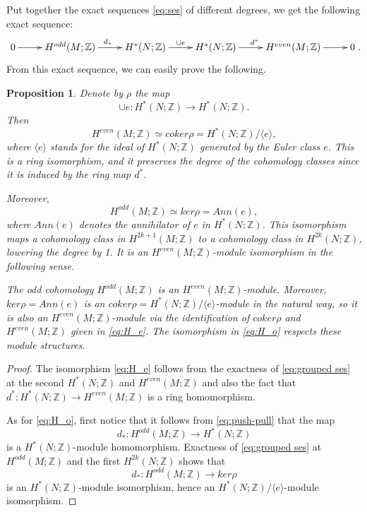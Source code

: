 \documentclass[12pt]{amsart}
\def\Z {{\mathbb{Z}}}
\newtheorem{proposition}[theorem]{Proposition}
\theoremstyle{definition}
\numberwithin{equation}{section}
\begin{document}
Put together the exact sequences \eqref{eq:ses} of different
degrees, we get the following exact sequence:
\begin{equation}\label{eq:grouped ses}
\xymatrix{
  0 \ar[r]^{} & H^{odd}(M;\Z) \ar[r]^{d_{*}} & H^{*}(N;\Z) \ar[r]^{\cup e} & H^{*}(N;\Z)
\ar[r]^{d^{*}} & H^{even}(M;\Z) \ar[r]^{} & 0
  }.
\end{equation}
From this exact sequence, we can easily prove the following.

\begin{proposition}\label{prop:(co)ker rho}
Denote by $\rho$ the map
\[\cup e: H^{*}(N;\Z)\rightarrow H^{*}(N;\Z).\]
Then
\begin{equation}\label{eq:H_e}
H^{even}(M;\Z)\simeq coker\rho = H^{*}(N;\Z)/\langle e\rangle,
\end{equation}
where $\langle e\rangle$ stands for the ideal of $H^{*}(N;\Z)$
generated by the Euler class $e$. This is a ring isomorphism, and it
preserves the degree of the cohomology classes since it is induced
by the ring map $d^{*}$.

 Moreover,
\begin{equation}\label{eq:H_o}
H^{odd}(M;\Z)\simeq  ker\rho = Ann(e),
\end{equation}
where $Ann(e)$ denotes the annihilator of $e$ in $H^{*}(N;\Z)$. This
isomorphism maps a cohomology class in $H^{2k+1}(M;\Z)$ to a
cohomology class in $H^{2k}(N;\Z)$, lowering the degree by 1. It is
an $H^{even}(M;\Z)$-module isomorphism in the following sense.

The odd cohomology $H^{odd}(M;\Z)$ is an $H^{even}(M;\Z)$-module.
Moreover, $ker\rho = Ann(e)$ is an $coker\rho = H^{*}(N;\Z)/\langle
e\rangle$-module in the natural way, so it is also an
$H^{even}(M;\Z)$-module via the identification of $coker\rho$ and
$H^{even}(M;\Z)$ given in \eqref{eq:H_e}. The isomorphism in
\eqref{eq:H_o} respects these module structures.
\end{proposition}
\begin{proof}
The isomorphism \eqref{eq:H_e} follows from the exactness of
\eqref{eq:grouped ses} at the second $H^{*}(N;\Z)$ and
$H^{even}(M;\Z)$ and also the fact that $d^{*}:
H^{*}(N;\Z)\rightarrow H^{even}(M;\Z)$ is a ring homomorphism.

As for \eqref{eq:H_o}, first notice that it follows from
\eqref{eq:push-pull} that the map
\begin{equation}
d_{*}: H^{odd}(M;\Z)\rightarrow H^{*}(N;\Z)
\end{equation}
is a $H^{*}(N;\Z)$-module homomorphism. Exactness of
\eqref{eq:grouped ses} at $H^{odd}(M;\Z)$ and the first
$H^{2k}(N;\Z)$ shows that
\begin{equation}
d_{*}: H^{odd}(M;\Z)\rightarrow ker\rho
\end{equation}
is an $H^{*}(N;\Z)$-module isomorphism, hence an
$H^{*}(N;\Z)/\langle e\rangle$-module isomorphism.
\end{proof}
\end{document}
